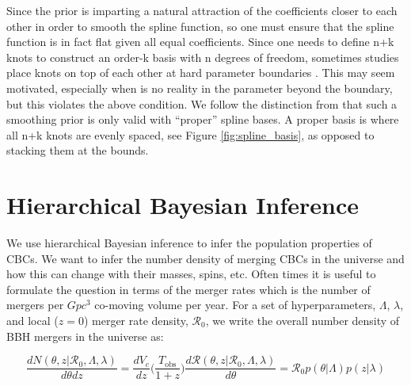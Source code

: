 
Since the prior is imparting a natural attraction of the coefficients closer to each other in order to smooth the spline function, so one 
must ensure that the spline function is in fact flat given all equal coefficients. Since one needs to define n+k knots to construct an order-k basis with 
n degrees of freedom, sometimes studies place knots on top of each other at hard parameter boundaries \cite{deBoor78,monotone_regression_splines}. 
This may seem motivated, especially when is no reality in the parameter beyond the boundary, but this violates the above condition. 
We follow the distinction from \citet{eilers2021practical} that such a smoothing prior is only valid with ``proper'' spline bases. 
A proper basis is where all n+k knots are evenly spaced, see Figure \ref{fig:spline_basis}, as opposed to stacking them at the bounds.

\section{Hierarchical Bayesian Inference} \label{sec:hierarchical_inference}

We use hierarchical Bayesian inference to infer the population properties of CBCs. We want to infer the number density of merging CBCs 
in the universe and how this can change with their masses, spins, etc. Often times it is useful to formulate the question in terms of the 
merger rates which is the number of mergers per $Gpc^{3}$ co-moving volume per year. For a set of hyperparameters, $\Lambda$, $\lambda$, and local ($z=0$) 
merger rate density, $\mathcal{R}_0$, we write the overall number density of BBH mergers in the universe as: 

\begin{equation} \label{number_density}
     \frac{dN(\theta, z | \mathcal{R}_0, \Lambda, \lambda)}{d\theta dz} = \frac{dV_c}{dz}\bigg(\frac{T_\mathrm{obs}}{1+z}\bigg) \frac{d\mathcal{R}(\theta, z | \mathcal{R}_0, \Lambda, \lambda)}{d\theta} = \mathcal{R}_0 p(\theta | \Lambda) p(z | \lambda)
\end{equation}

